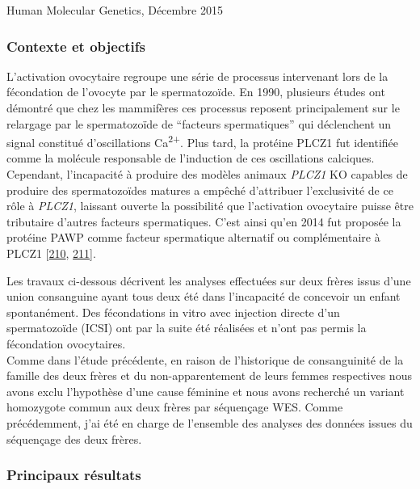 \documentclass[12pt,a4paper,twoside]{ugathesis}
\theoremstyle{definition}
\theoremstyle{definition}
\theoremstyle{definition}
\theoremstyle{remark}
\begin{document}
Human Molecular Genetics, Décembre 2015

\newpage

\subsubsection{Contexte et objectifs}\label{contexte-et-objectifs-1}

L'activation ovocytaire regroupe une série de processus intervenant lors
de la fécondation de l'ovocyte par le spermatozoïde. En 1990, plusieurs
études ont démontré que chez les mammifères ces processus reposent
principalement sur le relargage par le spermatozoïde de ``facteurs
spermatiques'' qui déclenchent un signal constitué d'oscillations
Ca\textsuperscript{2+}. Plus tard, la protéine PLCZ1 fut identifiée
comme la molécule responsable de l'induction de ces oscillations
calciques. Cependant, l'incapacité à produire des modèles animaux
\emph{PLCZ1} KO capables de produire des spermatozoïdes matures a
empêché d'attribuer l'exclusivité de ce rôle à \emph{PLCZ1}, laissant
ouverte la possibilité que l'activation ovocytaire puisse être
tributaire d'autres facteurs spermatiques. C'est ainsi qu'en 2014 fut
proposée la protéine PAWP comme facteur spermatique alternatif ou
complémentaire à PLCZ1 {[}\protect\hyperlink{ref-Aarabi2014}{210},
\protect\hyperlink{ref-Aarabi2014a}{211}{]}.

Les travaux ci-dessous décrivent les analyses effectuées sur deux frères
issus d'une union consanguine ayant tous deux été dans l'incapacité de
concevoir un enfant spontanément. Des fécondations in vitro avec
injection directe d'un spermatozoïde (ICSI) ont par la suite été
réalisées et n'ont pas permis la fécondation ovocytaires.\\
Comme dans l'étude précédente, en raison de l'historique de
consanguinité de la famille des deux frères et du non-apparentement de
leurs femmes respectives nous avons exclu l'hypothèse d'une cause
féminine et nous avons recherché un variant homozygote commun aux deux
frères par séquençage WES. Comme précédemment, j'ai été en charge de
l'ensemble des analyses des données issues du séquençage des deux
frères.

\newpage



\newpage

\subsubsection{Principaux résultats}\label{principaux-resultats-1}
\end{document}
